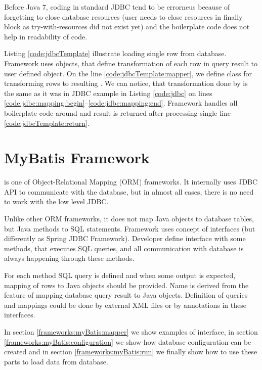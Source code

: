 Before Java 7, coding in standard JDBC tend to be errorneus because of forgetting to close
database resources (user needs to close resources in finally block as try-with-resources did not exist yet)
and the boilerplate code does not help in readability of code.

Listing \ref{code:jdbcTemplate} illustrate loading single row from database.
Framework uses  objects, that define transformation of
each row in query result to user defined object.
On the line \ref{code:jdbcTemplate:mapper}, we define  class
for transforming rows to resulting .
We can notice, that transformation done by  is the same as it was in JDBC example
in Listing \ref{code:jdbc} on lines \ref{code:jdbc:mapping:begin}--\ref{code:jdbc:mapping:end}.
Framework handles all boilerplate code around and result is returned
after processing single line \ref{code:jdbcTemplate:return}.







\section{MyBatis Framework \label{frameworks:myBatis}}

\citet{MyBatis} is one of Object-Relational Mapping (ORM) frameworks.
It internally uses JDBC API to communicate with the database, but in almost all cases,
there is no need to work with the low level JDBC.

Unlike other ORM frameworks, it does not map Java objects to database tables, but Java methods
to SQL statements. Framework uses concept of  interfaces (but differently as Spring JDBC Framework).
Developer define  interface with some methods, that executes SQL queries,
and all communication with database is always happening through these methods.

For each method SQL query is defined and when some output is expected,
mapping of rows to Java objects should be provided.
Name  is derived from the feature of mapping database query result
to Java objects.
Definition of queries and mappings could be done by
external XML files or by annotations in these interfaces.

In section \ref{frameworks:myBatis:mapper} we show examples of  interface,
in section \ref{frameworks:myBatis:configuration} we show how database configuration
can be created and in section \ref{frameworks:myBatis:run} we finally show how to
use these parts to load data from database.




